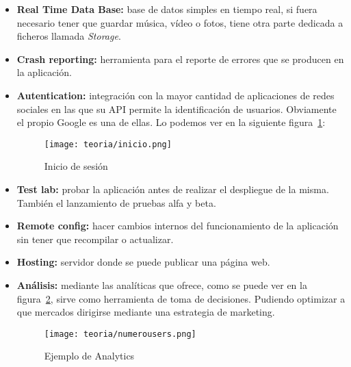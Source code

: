 \begin{itemize}
	\item \textbf{Real Time Data Base:} base de datos simples en tiempo real, si fuera necesario tener que guardar música, vídeo o fotos, tiene otra parte dedicada a ficheros llamada \emph{Storage}.
	\item \textbf{Crash reporting:} herramienta para el reporte de errores que se producen en la aplicación.
	\item \textbf{Autentication:} integración con la mayor cantidad de aplicaciones de redes sociales en las que su API permite la identificación de usuarios. Obviamente el propio Google es una de ellas. Lo podemos ver en la siguiente figura~\ref{fig:inicio}:
	\begin{figure}[H]
		\centering
		\texttt{[image: teoria/inicio.png]}
		\caption{Inicio de sesión}\label{fig:inicio}
	\end{figure}
	\item \textbf{Test lab:} probar la aplicación antes de realizar el despliegue de la misma. También el lanzamiento de pruebas alfa y beta.
	\item \textbf{Remote config:} hacer cambios internos del funcionamiento de la aplicación sin tener que recompilar o actualizar.
	\item \textbf{Hosting:} servidor donde se puede publicar una página web.
	\item \textbf{Análisis:} mediante las analíticas que ofrece, como se puede ver en la figura~\ref{fig:numerousers}, sirve como herramienta de toma de decisiones. Pudiendo optimizar a que mercados dirigirse mediante una estrategia de marketing.
	\begin{figure}[H]
		\centering
		\texttt{[image: teoria/numerousers.png]}
		\caption{Ejemplo de Analytics}\label{fig:numerousers}
	\end{figure}
\end{itemize}
